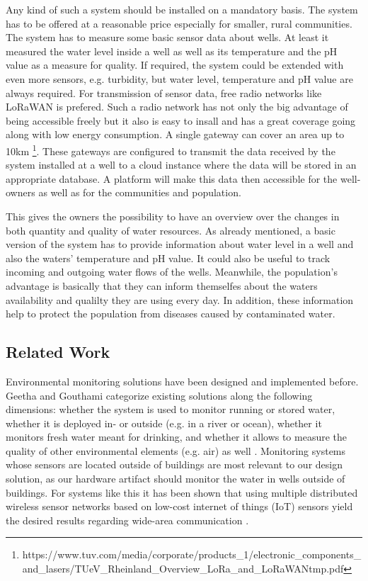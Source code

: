 \documentclass[11pt, letterpaper]{article}
\begin{document}
Any kind of such a system should be installed on a mandatory basis. The system has to be offered at a reasonable price especially for smaller, rural communities. The system has to measure some basic sensor data about wells. At least it measured the water level inside a well as well as its temperature and the pH value as a measure for quality. If required, the system could be extended with even more sensors, e.g. turbidity, but water level, temperature and pH value are always required. For transmission of sensor data, free radio networks like LoRaWAN is prefered. Such a radio network has not only the big advantage of being accessible freely but it also is easy to insall and has a great coverage going along with low energy consumption. A single gateway can cover an area up to 10km \footnote{https://www.tuv.com/media/corporate/products\_1/electronic\_components\_and\_lasers/\newline TUeV\_Rheinland\_Overview\_LoRa\_and\_LoRaWANtmp.pdf}. These gateways are configured to transmit the data received by the system installed at a well to a cloud instance where the data will be stored in an appropriate database. A platform will make this data then accessible for the well-owners as well as for the communities and population.
\newline

This gives the owners the possibility to have an overview over the changes in both quantity and quality of water resources. As already mentioned, a basic version of the system has to provide information about water level in a well and also the waters' temperature and pH value. It could also be useful to track incoming and outgoing water flows of the wells. Meanwhile, the population's advantage is basically that they can inform themselfes about the waters availability and qualilty they are using every day. In addition, these information help to protect the population from diseases caused by contaminated water.

\subsection{Related Work}
Environmental monitoring solutions have been designed and implemented before. Geetha and Gouthami categorize existing solutions along the following dimensions: whether the system is used to monitor running or stored water, whether it is deployed in- or outside (e.g. in a river or ocean), whether it monitors fresh water meant for drinking, and whether it allows to measure the quality of other environmental elements (e.g. air) as well \cite{geetha2016internet}. Monitoring systems whose sensors are located outside of buildings are most relevant to our design solution, as our hardware artifact should monitor the water in wells outside of buildings. For systems like this it has been shown that using multiple distributed wireless sensor networks based on low-cost internet of things (IoT) sensors yield the desired results regarding wide-area communication \cite{ingelrest2010sensorscope, geetha2016internet, jiang2009design, faustine2014wireless, zhenan2013sensor}.
\newline
\end{document}
